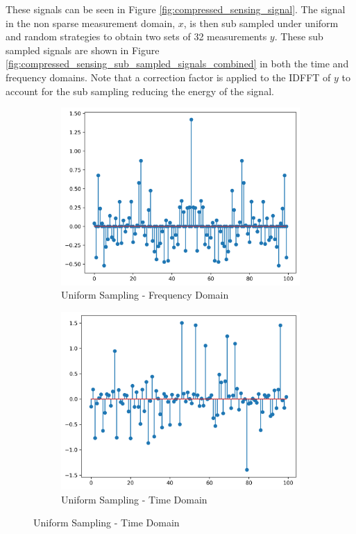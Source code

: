 \documentclass[11pt]{article}
\begin{document}
These signals can be seen in Figure \ref{fig:compressed_sensing_signal}. The signal in the non sparse measurement domain, \(x\), is then sub sampled under uniform and random strategies to obtain two sets of 32 measurements \( y \). These sub sampled signals are shown in Figure \ref{fig:compressed_sensing_sub_sampled_signals_combined} in both the time and frequency domains. Note that a correction factor is applied to the IDFFT of \(y\) to account for the sub sampling reducing the energy of the signal.

\begin{figure}[H]
    \centering
    \begin{subfigure}{.45\textwidth}
        \centering
        \includegraphics[width=\linewidth]{figs/q2b_uniformly_subsampled_signal_fft.png}
        \caption{Uniform Sampling - Frequency Domain}
        \label{fig:uniform_subsampled_signal_fft}
    \end{subfigure}%
    \begin{subfigure}{.45\textwidth}
        \centering
        \includegraphics[width=\linewidth]{figs/q2b_uniformly_subsampled_signal.png}
        \caption{Uniform Sampling - Time Domain}
        \label{fig:uniform_subsampled_signal}
    \end{subfigure}
    

\end{figure}
\end{document}
